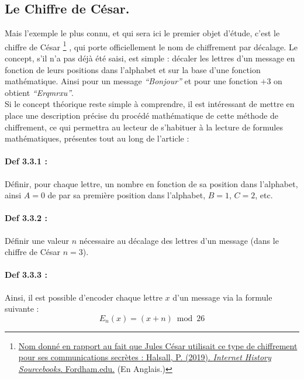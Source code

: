 \documentclass{article}
\begin{document}
\clearpage

\subsection{Le Chiffre de César.}\label{le-chiffre-de-cesar.}

Mais l'exemple le plus connu, et qui sera ici le premier objet d'étude, c'est le chiffre de César \footnote{\href{https://sourcebooks.fordham.edu/ancient/suetonius-julius.asp}{Nom donné en rapport au fait que Jules César utilisait ce type de chiffrement pour ses communications secrètes : Halsall, P. (2019). \textit{Internet History Sourcebooks}. Fordham.edu.} (En Anglais.)}
, qui porte officiellement le nom de chiffrement par décalage. Le concept, s'il n'a pas déjà été saisi, est simple : décaler les lettres d'un message en fonction de leurs positions dans l'alphabet et sur la base d'une fonction mathématique. Ainsi pour un message \textit{``Bonjour''} et pour une fonction \(+3\) on obtient \textit{``Erqmrxu''}.\\ 

Si le concept théorique reste simple à comprendre, il est intéressant de mettre en place une description précise du procédé mathématique de cette méthode de chiffrement, ce qui permettra au lecteur de s'habituer à la lecture de formules mathématiques, présentes tout au long de l'article :

\paragraph{Def 3.3.1 :}\label{def-3.3.1}

Définir, pour chaque lettre,
un nombre en fonction de sa position dans l'alphabet, ainsi \(A = 0\) de
par sa première position dans l'alphabet, \(B = 1\), \(C = 2\), etc.

\paragraph{Def 3.3.2 :}\label{def-3.3.2}

Définir une valeur \(n\) nécessaire au décalage des lettres d'un message
(dans le chiffre de César \(n=3\)).

\paragraph{Def 3.3.3 :}\label{def-3.3.3}

Ainsi, il est possible d'encoder chaque lettre \(x\) d'un message via la
formule suivante : \[
E_n(x)=(x+n)\bmod26
\] 
\end{document}
